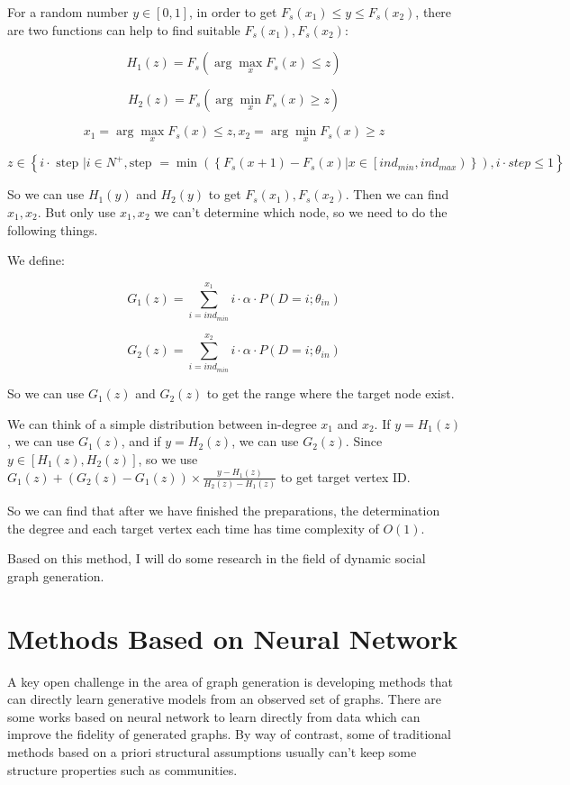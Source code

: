\begin{survey}
For a random number \(y\in [0,1]\), in order to get
\(F_s(x_1) \le y \le F_s(x_2)\), there are two functions can help to
find suitable \(F_s(x_1), F_s(x_2)\):

\[H_{1}(z)=F_{s}\left(\arg \max _{x} F_{s}(x) \leq z\right)\]

\[H_{2}(z)=F_{s}\left(\arg \min _{x} F_{s}(x) \geq z\right)\]

\[x_{1}=\arg \max _{x} F_{s}(x) \leq z, x_{2}=\arg \min _{x} F_{s}(x) \geq z\]

\[z \in\left\{i \cdot \text { step } | i \in N^{+}, \text {step }=\min \left(\left\{F_{s}(x+1)-F_{s}(x) | x \in\left[i n d_{m i n}, i n d_{m a x}\right)\right\}\right), i \cdot s t e p \leq 1\right\}\]

So we can use \(H_1(y)\) and \(H_2(y)\) to get \(F_s(x_1), F_s(x_2)\).
Then we can find \(x_1, x_2\). But only use \(x_1, x_2\) we can't
determine which node, so we need to do the following things.

We define:

\[ G_{1}(z) =\sum_{i=i n d_{m i n}}^{x_{1}} i \cdot \alpha \cdot P\left(D=i ; \theta_{i n}\right)\]

\[ G_{2}(z) =\sum_{i=i n d_{m i n}}^{x_{2}} i \cdot \alpha \cdot P\left(D=i ; \theta_{i n}\right) \]

So we can use \(G_1(z)\) and \(G_2(z)\) to get the range where the
target node exist.

We can think of a simple distribution between in-degree \(x_1\) and
\(x_2\). If \(y = H_1(z)\), we can use \(G_1(z)\), and if
\(y = H_2(z)\), we can use \(G_2(z)\). Since \(y \in [H_1(z), H_2(z)]\),
so we use
\(G_1(z) + \left(G_2(z) - G_1(z)\right) \times \frac {y-H_1(z)}{H_2(z)-H_1(z)}\)
to get target vertex ID.

So we can find that after we have finished the preparations, the
determination the degree and each target vertex each time has time
complexity of \(O(1)\).

Based on this method, I will do some research in the field of dynamic
social graph generation.

\section{Methods Based on Neural Network}

A key open challenge in the area of graph generation is developing
methods that can directly learn generative models from an observed set
of graphs. There are some works based on neural network to learn
directly from data which can improve the fidelity of generated graphs.
By way of contrast, some of traditional methods based on a priori
structural assumptions usually can't keep some structure properties such
as communities.


\end{survey}
